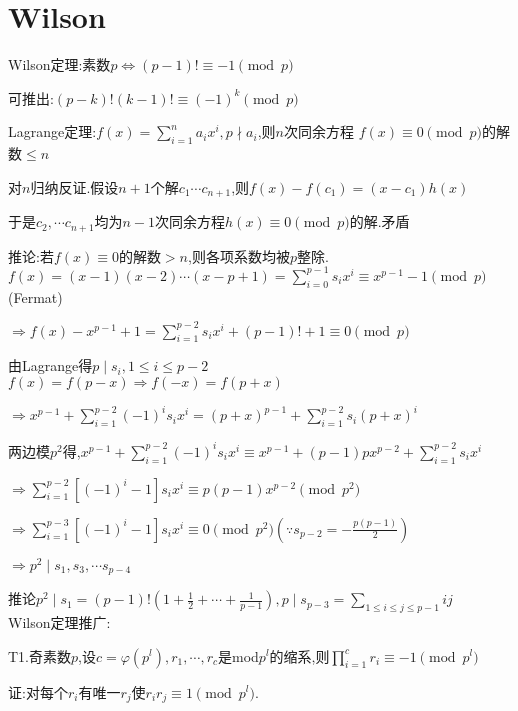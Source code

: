 
\section{Wilson}
Wilson定理:素数$ p \Leftrightarrow (p-1)!\equiv -1 \pmod p$

可推出:$ (p-k)!(k-1)!\equiv (-1)^k \pmod p$

Lagrange定理:$ f(x)=\sum_{i=1}^{n}{a_ix^i},p \nmid a_i$,则$ n$次同余方程
$ f(x) \equiv 0  \pmod p$的解数$  \le n$

对$ n$归纳反证.假设$ n+1$个解$ c_1\cdots c_{n+1}$,则$ f(x)-f(c_1)=(x-c_1)h(x)$

于是$ c_2,\cdots c_{n+1}$均为$ n-1$次同余方程$ h(x)\equiv 0 \pmod p$的解.矛盾

推论:若$ f(x)\equiv 0$的解数$ >n$,则各项系数均被$ p$整除.
\\

$ f(x)=(x-1)(x-2)\cdots (x-p+1)=\sum_{i=0}^{p-1}{s_ix^i}\equiv x^{p-1}-1 \pmod p $(Fermat)

$ \Rightarrow f(x)-x^{p-1}+1=\sum_{i=1}^{p-2}{s_ix^i}+(p-1)!+1\equiv 0 \pmod p$ 

由Lagrange得$ p\mid s_i,1\le i \le p-2$
\\

$ f(x)=f(p-x)\Rightarrow f(-x)=f(p+x)$ 

$ \Rightarrow x^{p-1}+\sum_{i=1}^{p-2}{(-1)^is_ix^i}=(p+x)^{p-1}+\sum_{i=1}^{p-2}{s_i(p+x)^i}$

两边模$ p^2$得,$ x^{p-1}+\sum_{i=1}^{p-2}{(-1)^is_ix^i}\equiv x^{p-1}+(p-1)px^{p-2}+\sum_{i=1}^{p-2}{s_ix^i}$

$ \Rightarrow \sum_{i=1}^{p-2}{[(-1)^i-1]s_ix^i}\equiv p(p-1)x^{p-2}\pmod {p^2}$ 

$ \Rightarrow \sum_{i=1}^{p-3}{[(-1)^i-1]s_ix^i}\equiv 0 \pmod {p^2}(\because s_{p-2}=-\frac{p(p-1)}{2})$

$ \Rightarrow p^2 \mid s_1,s_3,\cdots s_{p-4}$

推论$ p^2 \mid s_1=(p-1)!(1+\frac{1}{2}+\cdots+\frac{1}{p-1}),p \mid s_{p-3}=\sum_{1\le i\le j\le p-1}{ij}$
\\

Wilson定理推广:

T1.奇素数$ p$,设$ c=\varphi(p^l),r_1,\cdots,r_c$是mod$ p^l$的缩系,则$ \prod_{i=1}^{c}{r_i}\equiv -1 \pmod{p^l}$

证:对每个$ r_i$有唯一$ r_j$使$ r_ir_j\equiv1\pmod{p^l}.$

